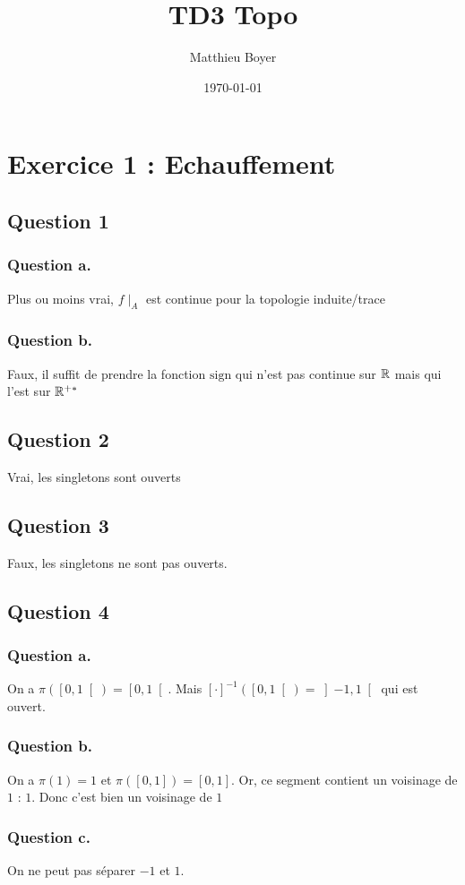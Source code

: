 \documentclass{cours}
\title{TD3 Topo}
\date{\today}
\author{Matthieu Boyer}
\begin{document}
\section{Exercice 1 : Echauffement}
    \subsection{Question 1}
        \subsubsection{Question a.}
            Plus ou moins vrai, $f\mid_{A}$ est continue pour la topologie induite/trace
        \subsubsection{Question b.}
            Faux, il suffit de prendre la fonction $\mathrm{sign}$ qui n'est pas continue sur 
             $\mathbb{R}$ mais qui l'est sur $\mathbb{R}^{+*}$
    \subsection{Question 2}
        Vrai, les singletons sont ouverts
    
    \subsection{Question 3}
        Faux, les singletons ne sont pas ouverts.
    
    \subsection{Question 4}
        \subsubsection{Question a.}
            On a $\pi\left(\left[0, 1\right[\right) = \left[0, 1\right[$. Mais $\left[\cdot\right]^{-1} \left(\left[0, 1\right[\right) = \left]-1, 1\right[$ qui est ouvert.

        \subsubsection{Question b.}
            On a $\pi(1) = 1$ et $\pi\left(\left[0, 1\right]\right) = \left[0, 1\right]$. Or, ce segment contient un voisinage de $1$ : ${1}$. Donc c'est bien un voisinage de $1$
        
        \subsubsection{Question c.}
            On ne peut pas séparer $-1$ et $1$.
        
\end{document}
